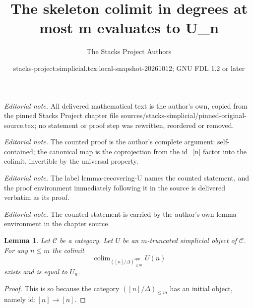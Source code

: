 \documentclass{stacks-project}
\title{The skeleton colimit in degrees at most m evaluates to U\_n}
\author{The Stacks Project Authors}
\date{stacks-project:simplicial.tex:local-snapshot-20261012; GNU FDL 1.2 or later}
\theoremstyle{plain}
\newtheorem{lemma}[subsection]{Lemma}
\theoremstyle{definition}
\theoremstyle{remark}
\numberwithin{equation}{subsection}
\def\colim{\mathop{\mathrm{colim}}\nolimits}
\begin{document}
\maketitle
\noindent\textit{Editorial note.} All delivered mathematical text is the author's own, copied from the pinned Stacks Project chapter file sources/stacks-simplicial/pinned-original-source.tex; no statement or proof step was rewritten, reordered or removed.\par\medskip
\noindent\textit{Editorial note.} The counted proof is the author's complete argument: self-contained; the canonical map is the coprojection from the id\_[n] factor into the colimit, invertible by the universal property.\par\medskip
\noindent\textit{Editorial note.} The label lemma-recovering-U names the counted statement, and the proof environment immediately following it in the source is delivered verbatim as its proof.\par\medskip
\noindent\textit{Editorial note.} The counted statement is carried by the author's own lemma environment in the chapter source.\par\medskip
\begin{lemma}
\label{lemma-recovering-U}
Let $\mathcal{C}$ be a category.
Let $U$ be an $m$-truncated simplicial object of $\mathcal{C}$.
For any $n \leq m$ the colimit
$$
\colim_{([n]/\Delta)_{\leq m}^{opp}} U(n)
$$
exists and is equal to $U_n$.
\end{lemma}

\begin{proof}
This is so because the category $([n]/\Delta)_{\leq m}$
has an initial object, namely $\text{id} : [n] \to [n]$.
\end{proof}
\end{document}
